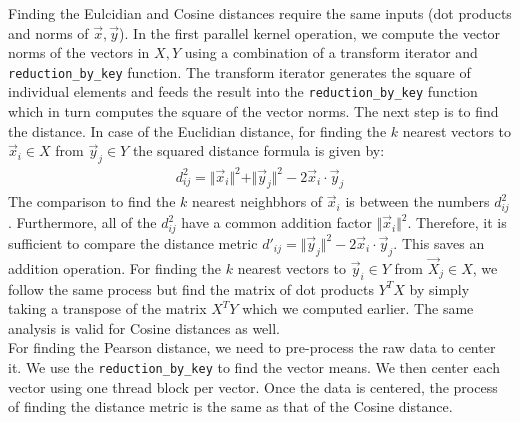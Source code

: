 \documentclass[10pt]{article}
\begin{document}
Finding the Eulcidian and Cosine distances require the same inputs (dot products and norms of $\vec{x}, \vec{y}$). In the first parallel kernel operation, we compute the vector norms of the vectors in $X,Y$ using a combination of a transform iterator and \texttt{reduction\_by\_key} function. The transform iterator generates the square of individual elements and feeds the result into the \texttt{reduction\_by\_key} function which in turn computes the square of the vector norms.  The next step is to find the distance. In case of the Euclidian distance,  for finding the $k$ nearest vectors to $\vec{x}_i \in X$ from $\vec{y}_j \in Y$ the squared distance formula is given by:
\begin{eqnarray*}
d^2_{ij} = \Vert \vec{x}_i \Vert^2+\Vert \vec{y}_j \Vert^2-2\vec{x}_i \cdot \vec{y}_j
\end{eqnarray*} 
The comparison to find the $k$ nearest neighbhors of $\vec{x}_i$ is between the numbers $d^2_{ij}$. Furthermore, all of the $d^2_{ij}$ have a common addition factor $\Vert \vec{x}_i \Vert^2$. Therefore, it is sufficient to compare the distance metric $d'_{ij} = \Vert \vec{y}_j \Vert^2-2\vec{x}_i \cdot \vec{y}_j$. This saves an addition operation. For finding the $k$ nearest vectors to $\vec{y}_i \in Y$ from $\vec{X}_j \in X$,  we follow the same process but find the matrix of dot products $Y^TX$ by simply taking a transpose of the matrix $X^TY$ which we computed earlier. The same analysis is valid for Cosine distances as well.\\

For finding the Pearson distance, we need to pre-process the raw data to center it. We use the \texttt{reduction\_by\_key} to find the vector means.  We then center each vector using one thread block per vector. Once the data is centered, the process of finding the distance metric is the same as that of the Cosine distance. \\
\end{document}
